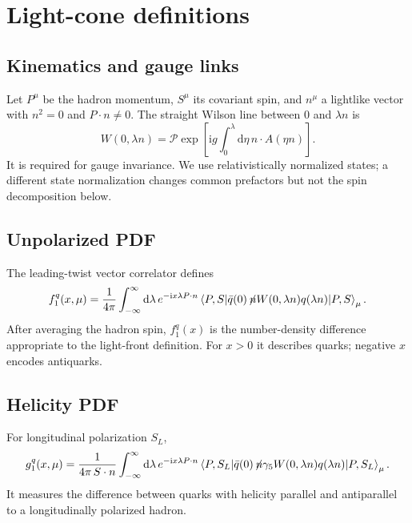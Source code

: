 \documentclass[11pt]{article}
\numberwithin{equation}{section}
\newcommand{\ii}{\mathrm{i}}
\newcommand{\dd}{\mathrm{d}}
\newcommand{\nslash}{\!\not\! n}
\newcommand{\avg}[1]{\left\langle #1\right\rangle}
\begin{document}
\section{Light-cone definitions}

\subsection{Kinematics and gauge links}

Let $P^\mu$ be the hadron momentum, $S^\mu$ its covariant spin, and $n^\mu$
a lightlike vector with $n^2=0$ and $P\cdot n\neq0$.  The straight Wilson line
between $0$ and $\lambda n$ is
\begin{equation}
  W(0,\lambda n)
  =\mathcal P\exp\left[
    \ii g\int_0^\lambda \dd\eta\, n\cdot A(\eta n)
  \right].
  \label{eq:lightlike-link}
\end{equation}
It is required for gauge invariance.  We use relativistically normalized
states; a different state normalization changes common prefactors but not
the spin decomposition below.

\subsection{Unpolarized PDF}

The leading-twist vector correlator defines
\begin{equation}
  f_1^q(x,\mu)
  =\frac{1}{4\pi}
   \int_{-\infty}^{\infty}\dd\lambda\,
   e^{-\ii x\lambda P\cdot n}
   \avg{P,S|\bar q(0)\nslash W(0,\lambda n)q(\lambda n)|P,S}_{\mu}.
  \label{eq:f1-definition}
\end{equation}
After averaging the hadron spin, $f_1^q(x)$ is the number-density difference
appropriate to the light-front definition.  For $x>0$ it describes quarks;
negative $x$ encodes antiquarks.

\subsection{Helicity PDF}

For longitudinal polarization $S_L$,
\begin{equation}
  g_1^q(x,\mu)
  =\frac{1}{4\pi\,S\cdot n}
   \int_{-\infty}^{\infty}\dd\lambda\,
   e^{-\ii x\lambda P\cdot n}
   \avg{P,S_L|\bar q(0)\nslash\gamma_5
   W(0,\lambda n)q(\lambda n)|P,S_L}_{\mu}.
  \label{eq:g1-definition}
\end{equation}
It measures the difference between quarks with helicity parallel and
antiparallel to a longitudinally polarized hadron.
\end{document}
